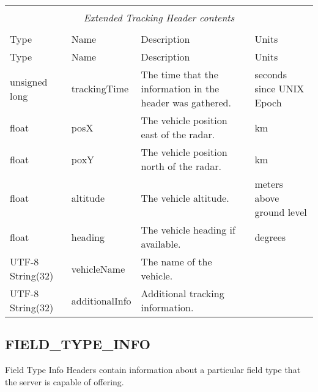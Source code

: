 \documentclass[10pt]{article}
\newcommand{\tblspc}{\rule{0pt}{3ex}}
\begin{document}
\begin{longtable}{|p{}|l|p{}|p{}|}
\hline
\multicolumn{4}{|c|}{} \\
\multicolumn{4}{|c|}{\emph{Extended Tracking Header contents}} \\
\multicolumn{4}{|c|}{} \\
\hline Type & Name & Description & Units \\ \hline \endfirsthead
\hline Type & Name & Description & Units \\ \hline \endhead
\hline \endfoot
\tblspc unsigned long & trackingTime & The time that the information in the header was gathered. & seconds since UNIX Epoch \\
\hline
\tblspc float & posX & The vehicle position east of the radar. & km \\
\hline
\tblspc float & poxY & The vehicle position north of the radar. & km \\
\hline
\tblspc float & altitude & The vehicle altitude. & meters above ground level \\
\hline
\tblspc float & heading & The vehicle heading if available. & degrees \\
\hline
\tblspc UTF-8 String(32) & vehicleName & The name of the vehicle. & \\
\hline
\tblspc UTF-8 String(32) & additionalInfo & Additional tracking information. & \\
\hline
\end{longtable}

\subsection{FIELD\_TYPE\_INFO}
\label{sec:field_type_info}
Field Type Info Headers contain information about a particular field type that the server is capable of offering.
\end{document}
